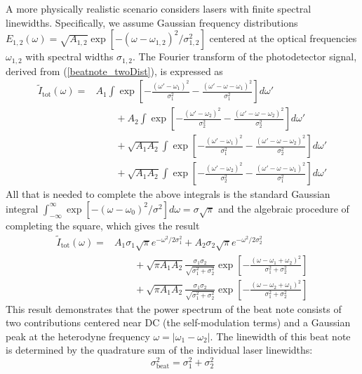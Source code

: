 A more physically realistic scenario considers lasers with finite spectral linewidths. Specifically, we assume Gaussian frequency distributions $E_{1,2}(\omega) = \sqrt{A_{1,2}} \exp\left[ -(\omega - \omega_{1,2})^2 / \sigma_{1,2}^2 \right]$ centered at the optical frequencies $\omega_{1,2}$ with spectral widths $\sigma_{1,2}$. The Fourier transform of the photodetector signal, derived from (\ref{beatnote_twoDist}), is expressed as
\begin{align*}
	\tilde{I}_\mathrm{tot}(\omega) =&
	A_1 \int \exp\left[-\frac{\left(\omega' - \omega_1\right)^2}{\sigma_1^2} - \frac{\left(\omega' - \omega - \omega_1\right)^2}{\sigma_1^2}\right]d\omega' \nonumber \\
	&\qquad +
	A_2 \int \exp\left[-\frac{\left(\omega' - \omega_2\right)^2}{\sigma_2^2} - \frac{\left(\omega' - \omega - \omega_2\right)^2}{\sigma_2^2}\right]d\omega' \nonumber \\
	&\qquad +
	\sqrt{A_1 A_2} \int \exp\left[-\frac{\left(\omega' - \omega_1\right)^2}{\sigma_1^2} - \frac{\left(\omega' - \omega - \omega_2\right)^2}{\sigma_2^2}\right]d\omega' \nonumber \\
	&\qquad +
	\sqrt{A_1 A_2} \int \exp\left[-\frac{\left(\omega' - \omega_2\right)^2}{\sigma_2^2} - \frac{\left(\omega' - \omega - \omega_1\right)^2}{\sigma_1^2}\right]d\omega'
\end{align*}
All that is needed to complete the above integrals is the standard Gaussian integral \newline $\int_{-\infty}^{\infty} \exp\left[-(\omega - \omega_0)^2/\sigma^2\right]d\omega = \sigma \sqrt{\pi}$ and the algebraic procedure of completing the square, which gives the result
\begin{align}
	\tilde{I}_\mathrm{tot}(\omega)
	=& A_1 \sigma_1 \sqrt{\pi} e^{-\omega^2 / 2\sigma_1^2} + A_2 \sigma_2 \sqrt{\pi} e^{-\omega^2 / 2\sigma_2^2} \nonumber \\
	&\qquad +
	\sqrt{\pi A_1 A_2}\frac{\sigma_1 \sigma_2}{\sqrt{\sigma_1^2 + \sigma_2^2}}\exp \left[-\frac{\left(\omega - \omega_1 + \omega_2\right)^2}{\sigma_1^2 + \sigma_2^2}\right] \nonumber \\
	&\qquad
	+
	\sqrt{\pi A_1 A_2}\frac{\sigma_1 \sigma_2}{\sqrt{\sigma_1^2 + \sigma_2^2}}\exp \left[-\frac{\left(\omega - \omega_2 + \omega_1\right)^2}{\sigma_1^2 + \sigma_2^2}\right]
\end{align}
This result demonstrates that the power spectrum of the beat note consists of two contributions centered near DC (the self-modulation terms) and a Gaussian peak at the heterodyne frequency $\omega = |\omega_1 - \omega_2|$. The linewidth of this beat note is determined by the quadrature sum of the individual laser linewidths:
\begin{equation}
	\sigma^2_\mathrm{beat} = \sigma_1^2 + \sigma_2^2
\end{equation}

